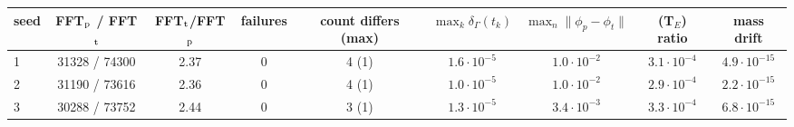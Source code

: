 \begin{tabular}{lcccccccc}
\toprule
seed & FFT$_{\rm p}$ / FFT$_{\rm t}$ & FFT$_{\rm t}$/FFT$_{\rm p}$ & failures & count differs (max) & $\max_k\delta_\Gamma(t_k)$ & $\max_n\|\phi_p-\phi_t\|$ & (T$_E$) ratio & mass drift\\
\midrule
1 & 31328 / 74300 & 2.37 & 0 & 4 (1) & $1.6\cdot10^{-5}$ & $1.0\cdot10^{-2}$ & $3.1\cdot10^{-4}$ & $4.9\cdot10^{-15}$\\
2 & 31190 / 73616 & 2.36 & 0 & 4 (1) & $1.0\cdot10^{-5}$ & $1.0\cdot10^{-2}$ & $2.9\cdot10^{-4}$ & $2.2\cdot10^{-15}$\\
3 & 30288 / 73752 & 2.44 & 0 & 3 (1) & $1.3\cdot10^{-5}$ & $3.4\cdot10^{-3}$ & $3.3\cdot10^{-4}$ & $6.8\cdot10^{-15}$\\
\bottomrule
\end{tabular}
